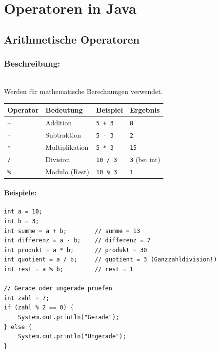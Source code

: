 \begingroup
\let\cleardoublepage\relax


\chapter*{Operatoren in Java}
\label{ch:operatoren-in-java}
\endgroup


\section*{Arithmetische Operatoren}

\subsection*{Beschreibung:}\\
Werden für mathematische Berechnungen verwendet.

\begin{center}
	\begin{tabular}{|l|l|l|l|}
		\hline
		\textbf{Operator} & \textbf{Bedeutung} & \textbf{Beispiel} & \textbf{Ergebnis} \\
		\hline
		\texttt{+} & Addition & \texttt{5 + 3} & \texttt{8} \\
		\hline
		\texttt{-} & Subtraktion & \texttt{5 - 3} & \texttt{2} \\
		\hline
		\texttt{*} & Multiplikation & \texttt{5 * 3} & \texttt{15} \\
		\hline
		\texttt{/} & Division & \texttt{10 / 3} & \texttt{3} (bei int) \\
		\hline
		\texttt{\%} & Modulo (Rest) & \texttt{10 \% 3} & \texttt{1} \\
		\hline
	\end{tabular}
\end{center}

\subsubsection*{Beispiele:}
\begin{lstlisting}
int a = 10;
int b = 3;
int summe = a + b;        // summe = 13
int differenz = a - b;    // differenz = 7
int produkt = a * b;      // produkt = 30
int quotient = a / b;     // quotient = 3 (Ganzzahldivision!)
int rest = a % b;         // rest = 1

// Gerade oder ungerade pruefen
int zahl = 7;
if (zahl % 2 == 0) {
    System.out.println("Gerade");
} else {
    System.out.println("Ungerade");
}
\end{lstlisting}

